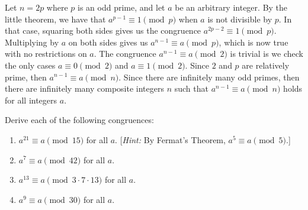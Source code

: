 \begin{solution}
    Let $n = 2p$ where $p$ is an odd prime, and let $a$ be an arbitrary integer. By the little theorem, we have that $a^{p-1} \equiv 1 \pmod{p}$ when $a$ is not divisible by $p$. In that case, squaring both sides gives us the congruence $a^{2p-2} \equiv 1 \pmod p$. Multiplying by $a$ on both sides gives us $a^{n-1} \equiv a \pmod p$, which is now true with no restrictions on $a$. The congruence $a^{n-1} \equiv a \pmod 2$ is trivial is we check the only cases $a \equiv 0 \pmod 2$ and $a \equiv 1 \pmod 2$. Since $2$ and $p$ are relatively prime, then $a^{n-1} \equiv a \pmod n$. Since there are infinitely many odd primes, then there are infinitely many composite integers $n$ such that $a^{n-1} \equiv a \pmod n$ holds for all integers $a$. \\
\end{solution}

\begin{exercise}
    Derive each of the following congruences:
    \begin{enumerate}
        \item $a^{21} \equiv a \pmod{15}$ for all $a$. [\textit{Hint:} By Fermat's Theorem, $a^5 \equiv a \pmod 5$.]
        \item $a^7 \equiv a \pmod {42}$ for all $a$.
        \item $a^{13} \equiv a \pmod{3 \cdot 7 \cdot 13}$ for all $a$.
        \item $a^{9} \equiv a \pmod{30}$ for all $a$.
    \end{enumerate}
\end{exercise}

